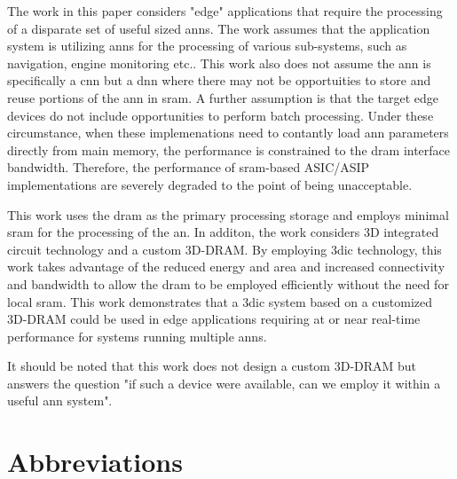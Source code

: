 The work in this paper considers "edge" applications that require the processing of a disparate set of useful sized \ac{ann}s. The work assumes that the application system is utilizing \ac{ann}s
for the processing of various sub-systems, such as navigation, engine monitoring etc.. This work also does not assume the \ac{ann} is specifically a \ac{cnn} but a \ac{dnn} where there may
not be opportuities to store and reuse portions of the \ac{ann} in \ac{sram}. A further assumption is that the target edge devices do not include opportunities to perform batch processing.
Under these circumstance, when these implemenations need to contantly load \ac{ann} parameters directly from main memory, the performance is constrained to the \ac{dram} interface bandwidth. Therefore, the performance of \ac{sram}-based ASIC/ASIP implementations are severely degraded to the point of being unacceptable.

This work uses the \ac{dram} as the primary processing storage and employs minimal \ac{sram} for the processing of the \ac{an}.
In additon, the work considers 3D integrated circuit technology and a custom 3D-DRAM. By employing \ac{3dic} technology, this work takes advantage of the reduced energy and area and increased
connectivity and bandwidth to allow the \ac{dram} to be employed efficiently without the need for local \ac{sram}.
This work demonstrates that a \ac{3dic} system based on a customized 3D-DRAM could be used in edge applications requiring at or near real-time performance for systems running multiple \ac{ann}s.

It should be noted that this work does not design a custom 3D-DRAM but answers the question "if such a device were available, can we employ it within a useful \ac{ann} system".



\section[Abbreviations]{Abbreviations}
\label{sec:Abbreviations}

\printacronyms[include-classes=abbrev,name={Acronyms}]

